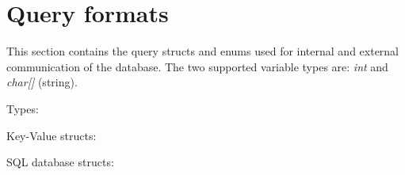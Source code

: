 \section{Query formats}
\label{sec:appendix-queries}
This section contains the query structs and enums used for internal and external communication of the database. The two supported variable types are: \textit{int} and \textit{char[]} (string).

\large Types:



\large Key-Value structs:



\large SQL database structs:

